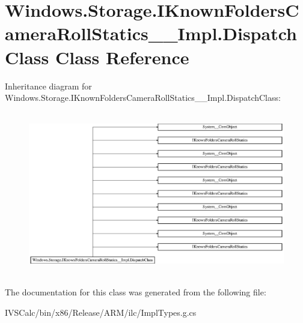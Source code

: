 \hypertarget{class_windows_1_1_storage_1_1_i_known_folders_camera_roll_statics_____impl_1_1_dispatch_class}{}\section{Windows.\+Storage.\+I\+Known\+Folders\+Camera\+Roll\+Statics\+\_\+\+\_\+\+Impl.\+Dispatch\+Class Class Reference}
\label{class_windows_1_1_storage_1_1_i_known_folders_camera_roll_statics_____impl_1_1_dispatch_class}
Inheritance diagram for Windows.\+Storage.\+I\+Known\+Folders\+Camera\+Roll\+Statics\+\_\+\+\_\+\+Impl.\+Dispatch\+Class\+:\begin{figure}[H]
\begin{center}
\leavevmode
\includegraphics[height=7.196262cm]{class_windows_1_1_storage_1_1_i_known_folders_camera_roll_statics_____impl_1_1_dispatch_class}
\end{center}
\end{figure}


The documentation for this class was generated from the following file\+:\begin{DoxyCompactItemize}
\item 
I\+V\+S\+Calc/bin/x86/\+Release/\+A\+R\+M/ilc/Impl\+Types.\+g.\+cs\end{DoxyCompactItemize}
